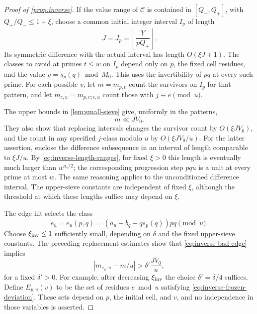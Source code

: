 \begin{proof}[Proof of \cref{prop:inverse}]
If the value range of \(\mathcal C\) is contained in
\([Q_-,Q_+]\), with \(Q_+/Q_-\le1+\xi\), choose a common initial
integer interval \(I_p\) of length
\[
 J=J_p=\left\lfloor\frac{Y}{pQ_+}\right\rfloor.
\]
Its symmetric difference with the actual interval has length
\(O(\xi J+1)\).  The classes to avoid at primes \(t\le w\) on \(I_p\)
depend only on \(p\), the fixed cell residues, and the value
\(v=s_p(q)\bmod M_0\).  This uses the invertibility of \(pq\) at every
such prime.  For each possible \(v\), let \(m=m_{p,v}\) count the
survivors on \(I_p\) for that pattern, and let \(m_{e,u}=m_{p,v;e,u}\)
count those with \(j\equiv e\pmod u\).

The upper bounds in \cref{lem:small-sieve} give, uniformly in the
patterns,
\begin{equation}
 m\ll JV_0.
 \label{eq:inverse-m-upper}
\end{equation}
They also show that replacing intervals changes the survivor count
by \(O(\xi JV_0)\), and the count in any specified \(j\)-class modulo
\(u\) by \(O(\xi JV_0/u)\).
For the latter assertion, enclose the difference subsequence in an
interval of length comparable to \(\xi J/u\).
By \eqref{eq:inverse-length-ranges}, for fixed \(\xi>0\) this length
is eventually much larger than \(w^{a_\star/2}\); the corresponding
progression step \(pqu\) is a unit at every prime at most \(w\).
The same reasoning applies to the unconditioned difference interval.
The upper-sieve constants are independent of fixed \(\xi\), although
the threshold at which these lengths suffice may depend on \(\xi\).

The edge hit selects the class
\begin{equation}
 e_u=e_u(p,q)=(a_u-b_q-q s_p(q))\overline{pq}\pmod u .
 \label{eq:inverse-edge-class}
\end{equation}
Choose \(\xi_{\rm inv}\le1\) sufficiently small, depending on
\(\delta\) and the fixed upper-sieve constants.
The preceding replacement estimates show that
\eqref{eq:inverse-bad-edge} implies
\begin{equation}
 |m_{e_u,u}-m/u|>\delta'\frac{JV_0}{u},
 \label{eq:inverse-frozen-deviation}
\end{equation}
for a fixed \(\delta'>0\).
For example, after decreasing \(\xi_{\rm inv}\) the choice
\(\delta'=\delta/4\) suffices.
Define \(E_{p,u}(v)\) to be the set of residues \(e\bmod u\) satisfying
\eqref{eq:inverse-frozen-deviation}.
These sets depend on \(p\), the initial cell, and \(v\), and no
independence in those variables is asserted.


\end{proof}
